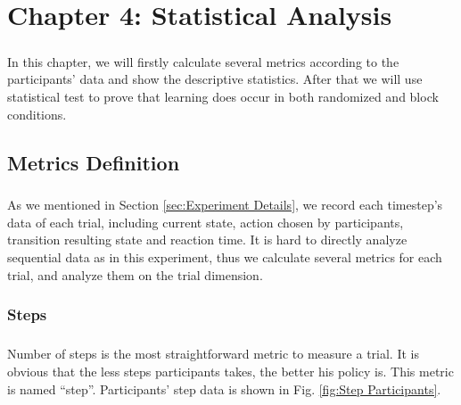 
\chapter{Chapter 4: Statistical Analysis} %

\label{Chapter 4} %

\paragraph{}
In this chapter, we will firstly calculate several metrics according to the participants' data and show the descriptive statistics. After that we will use statistical test to prove that learning does occur in both randomized and block conditions. 

\section{Metrics Definition}
\label{sec:Metrics Definition}
\paragraph{}
As we mentioned in Section \ref{sec:Experiment Details}, we record each timestep's data of each trial, including current state, action chosen by participants, transition resulting state and reaction time. It is hard to directly analyze sequential data as in this experiment, thus we calculate several metrics for each trial, and analyze them on the trial dimension. 
\subsection{Steps}
\label{sec:Steps}
\paragraph{}
Number of steps is the most straightforward metric to measure a trial. It is obvious that the less steps participants takes, the better his policy is. This metric is named \enquote{step}. Participants' step data is shown in Fig. \ref{fig:Step Participants}. 

